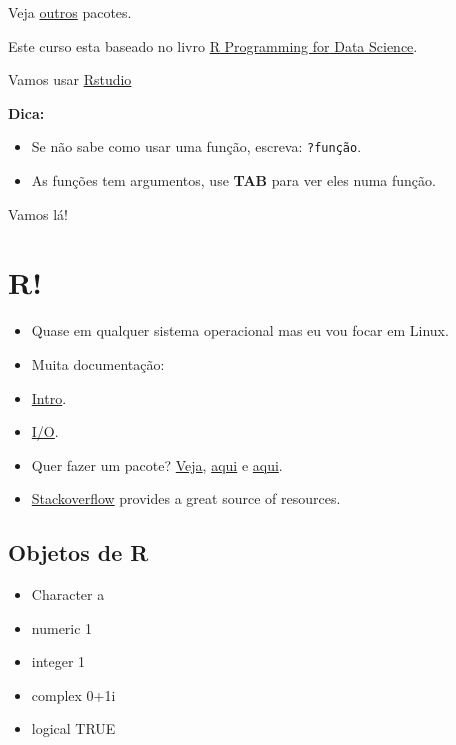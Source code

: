 \documentclass[]{book}
\providecommand{\tightlist}{%
  \setlength{\itemsep}{0pt}\setlength{\parskip}{0pt}}
\theoremstyle{definition}
\theoremstyle{definition}
\theoremstyle{definition}
\theoremstyle{remark}
\begin{document}
Veja
\href{https://cran.r-project.org/web/packages/available_packages_by_name.html}{outros}
pacotes.

Este curso esta baseado no livro
\href{https://leanpub.com/rprogramming}{R Programming for Data Science}.

Vamos usar \href{https://www.rstudio.com/}{Rstudio}

\textbf{Dica:}

\begin{itemize}
\tightlist
\item
  Se não sabe como usar uma função, escreva: \texttt{?função}.
\item
  As funções tem argumentos, use \textbf{TAB} para ver eles numa função.
\end{itemize}

Vamos lá!

\chapter{R!}\label{r}

\begin{itemize}
\tightlist
\item
  Quase em qualquer sistema operacional mas eu vou focar em Linux.
\item
  Muita documentação:
\item
  \href{http://cran.r-project.org/doc/manuals/r-release/R-intro.html}{Intro}.
\item
  \href{http://cran.r-project.org/doc/manuals/r-release/R-data.html}{I/O}.
\item
  Quer fazer um pacote?
  \href{http://cran.r-project.org/doc/manuals/r-release/R-exts.html}{Veja},
  \href{http://cran.r-project.org/doc/manuals/r-release/R-ints.html}{aqui}
  e
  \href{http://cran.r-project.org/doc/manuals/r-release/R-lang.html}{aqui}.
\item
  \href{https://stackoverflow.com/questions/tagged/r}{Stackoverflow}
  provides a great source of resources.
\end{itemize}

\section{Objetos de R}\label{objetos-de-r}

\begin{itemize}
\tightlist
\item
  Character a
\item
  numeric 1
\item
  integer 1
\item
  complex 0+1i
\item
  logical TRUE
\end{itemize}
\end{document}
